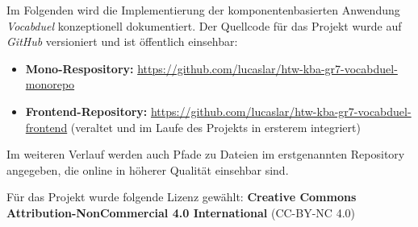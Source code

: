 Im Folgenden wird die Implementierung der komponentenbasierten Anwendung \textit{Vocabduel} konzeptionell dokumentiert.
Der Quellcode f\"ur das Projekt wurde auf \textit{GitHub} versioniert und ist \"offentlich einsehbar:

\begin{itemize}
    \item \textbf{Mono-Respository:} \url{https://github.com/lucaslar/htw-kba-gr7-vocabduel-monorepo}
    \item \textbf{Frontend-Repository:} \url{https://github.com/lucaslar/htw-kba-gr7-vocabduel-frontend} (veraltet und im Laufe des Projekts in ersterem integriert)
\end{itemize}

Im weiteren Verlauf werden auch Pfade zu Dateien im erstgenannten Repository angegeben, die online in h\"oherer Qualit\"at einsehbar sind.

F\"ur das Projekt wurde folgende Lizenz gew\"ahlt: \textbf{Creative Commons Attribution-NonCommercial 4.0 International} (CC-BY-NC 4.0)
